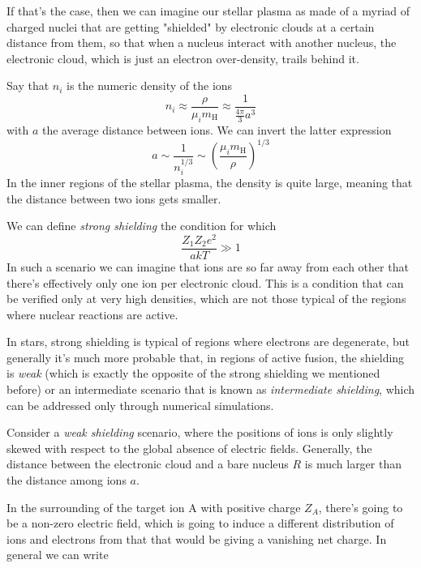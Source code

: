 \par If that's the case, then we can imagine our stellar plasma as made of a myriad of charged nuclei that are getting "shielded" by electronic clouds at a certain distance from them, so that when a nucleus interact with another nucleus, the electronic cloud, which is just an electron over-density, trails behind it.
\par Say that $n_{i}$ is the numeric density of the ions
\begin{equation*}
    n_{i} \approx \frac{\rho}{\mu_{i}m_{\text{H}}} \approx \frac{1}{\frac{4\pi}{3}a^{3}}
\end{equation*}
with $a$ the average distance between ions. We can invert the latter expression
\begin{equation*}
    a \sim \frac{1}{n_{i}^{1/3}} \sim \left(\frac{\mu_{i}m_{\text{H}}}{\rho}\right)^{1/3}
\end{equation*}
In the inner regions of the stellar plasma, the density is quite large, meaning that the distance between two ions gets smaller.
\par We can define \emph{strong shielding} the condition for which 
\begin{equation}
    \frac{Z_{1}Z_{2}e^{2}}{akT} \gg 1
    \label{eq:strongshielding}
\end{equation}
In such a scenario we can imagine that ions are so far away from each other that there's effectively only one ion per electronic cloud. This is a condition that can be verified only at very high densities, which are not those typical of the regions where nuclear reactions are active.
\par In stars, strong shielding is typical of regions where electrons are degenerate, but generally it's much more probable that, in regions of active fusion, the shielding is \emph{weak} (which is exactly the opposite of the strong shielding we mentioned before) or an intermediate scenario that is known as \emph{intermediate shielding}, which can be addressed only through numerical simulations.
\par Consider a \emph{weak shielding} scenario, where the positions of ions is only slightly skewed with respect to the global absence of electric fields. Generally, the distance between the electronic cloud and a bare nucleus $R$ is much larger than the distance among ions $a$.
\par In the surrounding of the target ion A with positive charge $Z_{A}$, there's going to be a non-zero electric field, which is going to induce a different distribution of ions and electrons from that that would be giving a vanishing net charge. In general we can write 
